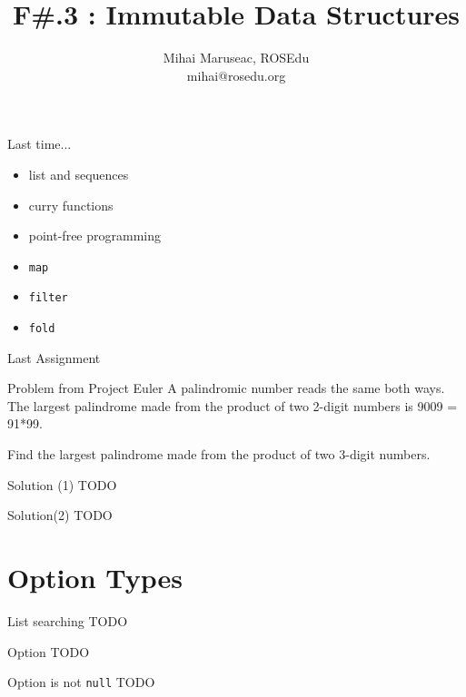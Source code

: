 \documentclass{beamer}
\title{F\#.3 : Immutable Data Structures}
\author{Mihai Maruseac, ROSEdu\\mihai@rosedu.org}
\begin{document}
\maketitle

\begin{frame}
  \tableofcontents
\end{frame}

\begin{frame}{Last time...}
  \begin{itemize}[<+->]
    \item list and sequences
    \item curry functions
    \item point-free programming
    \item \texttt{map}
    \item \texttt{filter}
    \item \texttt{fold}
  \end{itemize}
\end{frame}

\begin{frame}{Last Assignment}
  \begin{block}{Problem from Project Euler}
  A palindromic number reads the same both ways. The largest palindrome made
  from the product of two 2-digit numbers is 9009 = 91*99.

  Find the largest palindrome made from the product of two 3-digit numbers.
  \end{block}
\end{frame}

\begin{frame}[fragile]{Solution (1)}
  TODO
\end{frame}

\begin{frame}[fragile]{Solution(2)}
  TODO
\end{frame}

\section{Option Types}
\frame{\tableofcontents[currentsection]}

\begin{frame}{List searching}
  TODO
\end{frame}

\begin{frame}{Option}
  TODO
\end{frame}

\begin{frame}{Option is not \texttt{null}}
  TODO
\end{frame}
\end{document}
